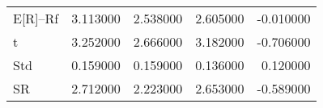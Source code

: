 \begin{tabular}{lrrrr}
\toprule
\midrule
E[R]--Rf & 3.113000 & 2.538000 & 2.605000 & -0.010000 \\
t & 3.252000 & 2.666000 & 3.182000 & -0.706000 \\
Std & 0.159000 & 0.159000 & 0.136000 & 0.120000 \\
SR & 2.712000 & 2.223000 & 2.653000 & -0.589000 \\
\bottomrule
\end{tabular}
